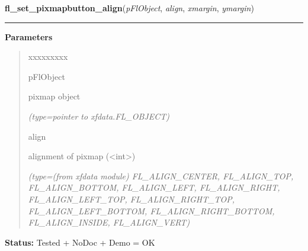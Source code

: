     \vspace{0.5ex}

\hspace{.8\funcindent}\begin{boxedminipage}{\funcwidth}

    \raggedright \textbf{fl\_set\_pixmapbutton\_align}(\textit{pFlObject}, \textit{align}, \textit{xmargin}, \textit{ymargin})

    \vspace{-1.5ex}

    \rule{\textwidth}{0.5\fboxrule}
\setlength{\parskip}{2ex}
\setlength{\parskip}{1ex}
      \textbf{Parameters}
      \vspace{-1ex}

      \begin{quote}
        \begin{Ventry}{xxxxxxxxx}

          \item[pFlObject]

          pixmap object

            {\it (type=pointer to xfdata.FL\_OBJECT)}

          \item[align]

          alignment of pixmap ({\textless}int{\textgreater})

            {\it (type=(from xfdata module) FL\_ALIGN\_CENTER, FL\_ALIGN\_TOP, FL\_ALIGN\_BOTTOM, 
FL\_ALIGN\_LEFT, FL\_ALIGN\_RIGHT, FL\_ALIGN\_LEFT\_TOP, 
FL\_ALIGN\_RIGHT\_TOP, FL\_ALIGN\_LEFT\_BOTTOM, FL\_ALIGN\_RIGHT\_BOTTOM, 
FL\_ALIGN\_INSIDE, FL\_ALIGN\_VERT)}

        \end{Ventry}

      \end{quote}

\textbf{Status:} Tested + NoDoc + Demo = OK



    \end{boxedminipage}

    \label{xformslib:flbitmap:fl_set_pixmap_pixmap}

    \vspace{0.5ex}

